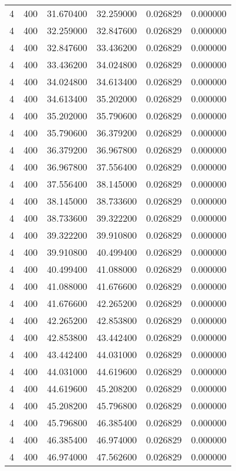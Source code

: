 \begin{longtable}{rrrrrr}
4 & 400 & 31.670400 & 32.259000 & 0.026829 & 0.000000 \\
4 & 400 & 32.259000 & 32.847600 & 0.026829 & 0.000000 \\
4 & 400 & 32.847600 & 33.436200 & 0.026829 & 0.000000 \\
4 & 400 & 33.436200 & 34.024800 & 0.026829 & 0.000000 \\
4 & 400 & 34.024800 & 34.613400 & 0.026829 & 0.000000 \\
4 & 400 & 34.613400 & 35.202000 & 0.026829 & 0.000000 \\
4 & 400 & 35.202000 & 35.790600 & 0.026829 & 0.000000 \\
4 & 400 & 35.790600 & 36.379200 & 0.026829 & 0.000000 \\
4 & 400 & 36.379200 & 36.967800 & 0.026829 & 0.000000 \\
4 & 400 & 36.967800 & 37.556400 & 0.026829 & 0.000000 \\
4 & 400 & 37.556400 & 38.145000 & 0.026829 & 0.000000 \\
4 & 400 & 38.145000 & 38.733600 & 0.026829 & 0.000000 \\
4 & 400 & 38.733600 & 39.322200 & 0.026829 & 0.000000 \\
4 & 400 & 39.322200 & 39.910800 & 0.026829 & 0.000000 \\
4 & 400 & 39.910800 & 40.499400 & 0.026829 & 0.000000 \\
4 & 400 & 40.499400 & 41.088000 & 0.026829 & 0.000000 \\
4 & 400 & 41.088000 & 41.676600 & 0.026829 & 0.000000 \\
4 & 400 & 41.676600 & 42.265200 & 0.026829 & 0.000000 \\
4 & 400 & 42.265200 & 42.853800 & 0.026829 & 0.000000 \\
4 & 400 & 42.853800 & 43.442400 & 0.026829 & 0.000000 \\
4 & 400 & 43.442400 & 44.031000 & 0.026829 & 0.000000 \\
4 & 400 & 44.031000 & 44.619600 & 0.026829 & 0.000000 \\
4 & 400 & 44.619600 & 45.208200 & 0.026829 & 0.000000 \\
4 & 400 & 45.208200 & 45.796800 & 0.026829 & 0.000000 \\
4 & 400 & 45.796800 & 46.385400 & 0.026829 & 0.000000 \\
4 & 400 & 46.385400 & 46.974000 & 0.026829 & 0.000000 \\
4 & 400 & 46.974000 & 47.562600 & 0.026829 & 0.000000 \\

\end{longtable}
